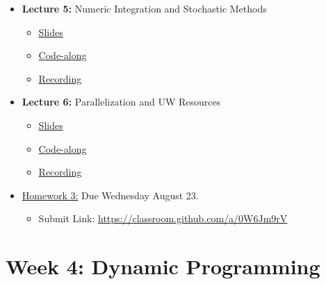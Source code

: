 \documentclass[
]{book}
\providecommand{\tightlist}{%
  \setlength{\itemsep}{0pt}\setlength{\parskip}{0pt}}
\begin{document}
\begin{itemize}
\tightlist
\item
  \textbf{Lecture 5:} Numeric Integration and Stochastic Methods

  \begin{itemize}
  \tightlist
  \item
    \href{https://kevinghunt.github.io/ComputationCamp/lectures/Lecture5.html}{Slides}
  \item
    \href{https://kevinghunt.github.io/ComputationCamp/codealongs/CodeAlong5.jl}{Code-along}
  \item
    \href{https://uwmadison.zoom.us/rec/share/Rc-Mno_HDmfyakQGBhzxhbOjYIxXkX8ka4vkksy2p5Y-lxDZCJ2x08U8ja6LzMEV.54CVfkLcQhOLID_m}{Recording}
  \end{itemize}
\item
  \textbf{Lecture 6:} Parallelization and UW Resources

  \begin{itemize}
  \tightlist
  \item
    \href{https://kevinghunt.github.io/ComputationCamp/lectures/Lecture6.html}{Slides}
  \item
    \href{https://kevinghunt.github.io/ComputationCamp/codealongs/CodeAlong6.jl}{Code-along}
  \item
    \href{https://uwmadison.zoom.us/rec/share/ZkkEGxop9imwlGAfhqobNSm9M5uRupUj3DqE1xGMBTo7-ZmJKzO92OSKJ5d_I7JM.KK3JK7rsgIHu7yuc}{Recording}
  \end{itemize}
\item
  \href{https://kevinghunt.github.io/ComputationCamp/homeworks/homework3.html}{Homework 3:} Due Wednesday August 23.

  \begin{itemize}
  \tightlist
  \item
    Submit Link: \url{https://classroom.github.com/a/0W6Jm9rV}
  \end{itemize}
\end{itemize}

\hypertarget{week-4-dynamic-programming-1}{%
\section{Week 4: Dynamic Programming}\label{week-4-dynamic-programming-1}}
\end{document}
